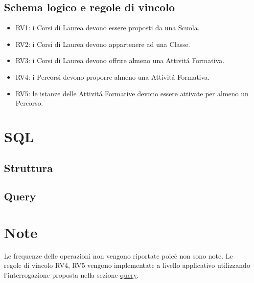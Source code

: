 \documentclass[a4paper,12pt,italian,towside]{article}
\begin{document}
\subsection{Schema logico e regole di vincolo}

\begin{itemize}
	\item RV1: i Corsi di Laurea devono essere proposti da una Scuola.
	\item RV2: i Corsi di Laurea devono appartenere ad una Classe.
	\item RV3: i Corsi di Laurea devono offrire almeno una Attivit\'a Formativa.
	\item RV4: i Percorsi devono proporre almeno una Attivit\'a Formativa.
	\item RV5: le istanze delle Attivit\'a Formative devono essere attivate per almeno un Percorso.
\end{itemize}

\newpage
\section{SQL}



\subsection{Struttura}



\subsection{Query}
\label{sql:query}


\newpage

\section{Note}

Le frequenze delle operazioni non vengono riportate poic\'e non sono note.
Le regole di vincolo RV4, RV5 vengono implementate a livello applicativo utilizzando l'interrogazione proposta nella sezione \hyperref[sql:query]{query}.


%
%

\end{document}
